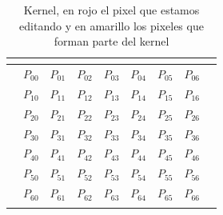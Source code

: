 \begin{table}[h]
\centering
\begin{tabular}{l|c|c|c|c|c|c|c|l}
 & \multicolumn{1}{l|}{}       & \multicolumn{1}{l|}{}      & \multicolumn{1}{l|}{}       & \multicolumn{1}{l|}{}       & \multicolumn{1}{l|}{}       & \multicolumn{1}{l|}{}       & \multicolumn{1}{l|}{}      &  \\ \hline
 & \cellcolor[HTML]{FAFE8E}$P_{00}$ & \cellcolor[HTML]{FAFE8E}$P_{01}$  & \cellcolor[HTML]{FAFE8E}$P_{02}$  & \cellcolor[HTML]{FAFE8E}$P_{03}$  & \cellcolor[HTML]{FAFE8E}$P_{04}$  & \cellcolor[HTML]{FAFE8E}$P_{05}$ & \cellcolor[HTML]{FAFE8E}$P_{06}$ &  \\ \hline
 & \cellcolor[HTML]{FAFE8E}$P_{10}$ & \cellcolor[HTML]{FAFE8E}$P_{11}$  & \cellcolor[HTML]{FAFE8E}$P_{12}$  & \cellcolor[HTML]{FAFE8E}$P_{13}$  & \cellcolor[HTML]{FAFE8E}$P_{14}$  & \cellcolor[HTML]{FAFE8E}$P_{15}$ & \cellcolor[HTML]{FAFE8E}$P_{16}$ &  \\ \hline
 & \cellcolor[HTML]{FAFE8E}$P_{20}$ & \cellcolor[HTML]{FAFE8E}$P_{21}$  & \cellcolor[HTML]{FAFE8E}$P_{22}$  & \cellcolor[HTML]{FAFE8E}$P_{23}$  & \cellcolor[HTML]{FAFE8E}$P_{24}$  & \cellcolor[HTML]{FAFE8E}$P_{25}$ & \cellcolor[HTML]{FAFE8E}$P_{26}$ &  \\ \hline
 & \cellcolor[HTML]{FAFE8E}$P_{30}$ & \cellcolor[HTML]{FAFE8E}$P_{31}$  & \cellcolor[HTML]{FAFE8E}$P_{32}$  & \cellcolor[HTML]{FE8E8E}$P_{33}$  & \cellcolor[HTML]{FAFE8E}$P_{34}$  & \cellcolor[HTML]{FAFE8E}$P_{35}$ & \cellcolor[HTML]{FAFE8E}$P_{36}$ &  \\ \hline
 & \cellcolor[HTML]{FAFE8E}$P_{40}$ & \cellcolor[HTML]{FAFE8E}$P_{41}$  & \cellcolor[HTML]{FAFE8E}$P_{42}$  & \cellcolor[HTML]{FAFE8E}$P_{43}$  & \cellcolor[HTML]{FAFE8E}$P_{44}$  & \cellcolor[HTML]{FAFE8E}$P_{45}$ & \cellcolor[HTML]{FAFE8E}$P_{46}$ &  \\ \hline
 & \cellcolor[HTML]{FAFE8E}$P_{50}$ & \cellcolor[HTML]{FAFE8E}$P_{51}$  & \cellcolor[HTML]{FAFE8E}$P_{52}$  & \cellcolor[HTML]{FAFE8E}$P_{53}$  & \cellcolor[HTML]{FAFE8E}$P_{54}$  & \cellcolor[HTML]{FAFE8E}$P_{55}$ & \cellcolor[HTML]{FAFE8E}$P_{56}$ &  \\ \hline
 & \cellcolor[HTML]{FAFE8E}$P_{60}$ & \cellcolor[HTML]{FAFE8E}$P_{61}$  & \cellcolor[HTML]{FAFE8E}$P_{62}$  & \cellcolor[HTML]{FAFE8E}$P_{63}$  & \cellcolor[HTML]{FAFE8E}$P_{64}$  & \cellcolor[HTML]{FAFE8E}$P_{65}$ & \cellcolor[HTML]{FAFE8E}$P_{66}$ &  \\ \hline
 & \multicolumn{1}{l|}{}      & \multicolumn{1}{l|}{}      & \multicolumn{1}{l|}{}       & \multicolumn{1}{l|}{}       & \multicolumn{1}{l|}{}       & \multicolumn{1}{l|}{}       & \multicolumn{1}{l|}{}      &
\end{tabular}
\caption{Kernel, en rojo el pixel que estamos editando y en amarillo los pixeles que forman parte del kernel}
\end{table}


